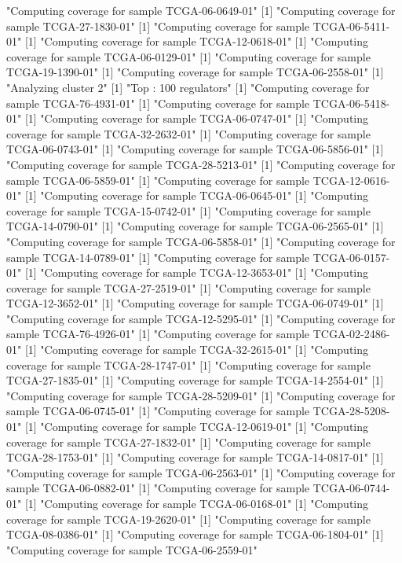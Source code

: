 \documentclass{article}
\begin{document}
\begin{Schunk}
[1] "Computing coverage for sample TCGA-06-0649-01"
[1] "Computing coverage for sample TCGA-27-1830-01"
[1] "Computing coverage for sample TCGA-06-5411-01"
[1] "Computing coverage for sample TCGA-12-0618-01"
[1] "Computing coverage for sample TCGA-06-0129-01"
[1] "Computing coverage for sample TCGA-19-1390-01"
[1] "Computing coverage for sample TCGA-06-2558-01"
[1] "Analyzing cluster 2"
[1] "Top :  100  regulators"
[1] "Computing coverage for sample TCGA-76-4931-01"
[1] "Computing coverage for sample TCGA-06-5418-01"
[1] "Computing coverage for sample TCGA-06-0747-01"
[1] "Computing coverage for sample TCGA-32-2632-01"
[1] "Computing coverage for sample TCGA-06-0743-01"
[1] "Computing coverage for sample TCGA-06-5856-01"
[1] "Computing coverage for sample TCGA-28-5213-01"
[1] "Computing coverage for sample TCGA-06-5859-01"
[1] "Computing coverage for sample TCGA-12-0616-01"
[1] "Computing coverage for sample TCGA-06-0645-01"
[1] "Computing coverage for sample TCGA-15-0742-01"
[1] "Computing coverage for sample TCGA-14-0790-01"
[1] "Computing coverage for sample TCGA-06-2565-01"
[1] "Computing coverage for sample TCGA-06-5858-01"
[1] "Computing coverage for sample TCGA-14-0789-01"
[1] "Computing coverage for sample TCGA-06-0157-01"
[1] "Computing coverage for sample TCGA-12-3653-01"
[1] "Computing coverage for sample TCGA-27-2519-01"
[1] "Computing coverage for sample TCGA-12-3652-01"
[1] "Computing coverage for sample TCGA-06-0749-01"
[1] "Computing coverage for sample TCGA-12-5295-01"
[1] "Computing coverage for sample TCGA-76-4926-01"
[1] "Computing coverage for sample TCGA-02-2486-01"
[1] "Computing coverage for sample TCGA-32-2615-01"
[1] "Computing coverage for sample TCGA-28-1747-01"
[1] "Computing coverage for sample TCGA-27-1835-01"
[1] "Computing coverage for sample TCGA-14-2554-01"
[1] "Computing coverage for sample TCGA-28-5209-01"
[1] "Computing coverage for sample TCGA-06-0745-01"
[1] "Computing coverage for sample TCGA-28-5208-01"
[1] "Computing coverage for sample TCGA-12-0619-01"
[1] "Computing coverage for sample TCGA-27-1832-01"
[1] "Computing coverage for sample TCGA-28-1753-01"
[1] "Computing coverage for sample TCGA-14-0817-01"
[1] "Computing coverage for sample TCGA-06-2563-01"
[1] "Computing coverage for sample TCGA-06-0882-01"
[1] "Computing coverage for sample TCGA-06-0744-01"
[1] "Computing coverage for sample TCGA-06-0168-01"
[1] "Computing coverage for sample TCGA-19-2620-01"
[1] "Computing coverage for sample TCGA-08-0386-01"
[1] "Computing coverage for sample TCGA-06-1804-01"
[1] "Computing coverage for sample TCGA-06-2559-01"

\end{Schunk}
\end{document}
